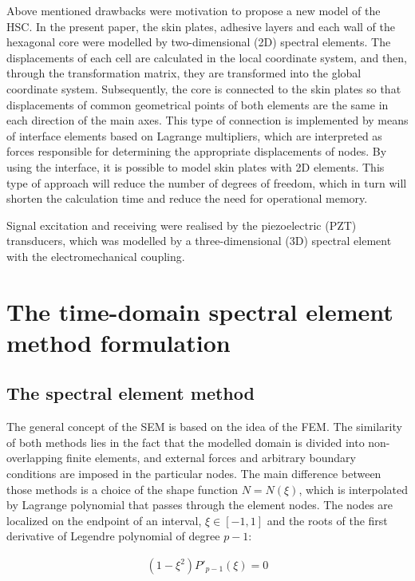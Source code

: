 \documentclass[a4paper,12pt]{article}
\begin{document}
{Above mentioned drawbacks were motivation to propose a new model of the HSC. 
In the present paper, the skin plates, adhesive layers and each wall of the hexagonal core were modelled by two-dimensional (2D) spectral elements.
The displacements of each cell are calculated in the local coordinate system, 
and then, through the transformation matrix, they are transformed into the 
global coordinate system.
Subsequently, the core is connected to the skin plates so that displacements of 
common geometrical points of both elements are the same in each direction of 
the main axes.
This type of connection is implemented by means of interface elements based on 
Lagrange multipliers, which are interpreted as forces responsible for 
determining the appropriate displacements of nodes.
By using the interface, it is possible to model skin plates with 2D elements.
This type of approach will reduce the number of degrees of freedom, which in 
turn will shorten the calculation time and reduce the need for operational 
memory.

Signal excitation and receiving were realised by the piezoelectric (PZT) transducers, which was modelled by a three-dimensional (3D) spectral element with the electromechanical coupling.
\section{The time-domain spectral element method formulation}
\label{sec:time_SEM}
\subsection{The spectral element method}
\label{sec:sem}
The general concept of the SEM is based on the idea of the FEM.
The similarity of both methods lies in the fact that the modelled domain is divided into non-overlapping finite elements, and external forces and arbitrary boundary conditions are imposed in the particular nodes.
The main difference between those methods is a choice of the shape function \( N=N(\xi )\), which is interpolated by Lagrange polynomial that passes through the element nodes. The nodes are localized on the endpoint of an interval, \(\xi\in[-1,1]\) and the roots of the first derivative of Legendre polynomial of degree \(p-1\):

\begin{eqnarray}
(1-\xi^2)P'_{p-1}(\xi)=0
\label{eq:nodes}
\end{eqnarray}

}
\end{document}
